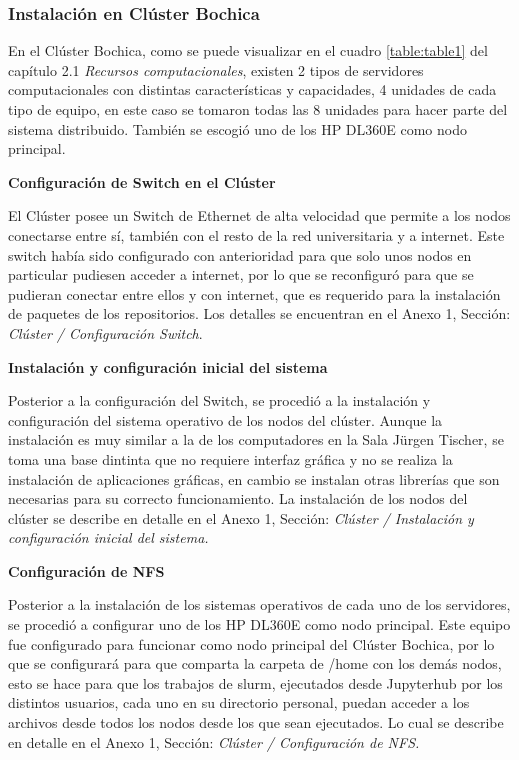 \begin{spacing}{1.5}
  \subsubsection{Instalación en Clúster Bochica}

  En el Clúster Bochica, como se puede visualizar en el cuadro \ref{table:table1} del capítulo 2.1 \textit{Recursos computacionales}, existen 2 tipos de servidores computacionales con distintas características y capacidades, 4 unidades de cada tipo de equipo, en este caso se tomaron todas las 8 unidades para hacer parte del sistema distribuido. También se escogió uno de los HP DL360E como nodo principal.

  \textbf{Configuración de Switch en el Clúster}

  El Clúster posee un Switch de Ethernet de alta velocidad que permite a los nodos conectarse entre sí, también con el resto de la red universitaria y a internet. Este switch había sido configurado con anterioridad para que solo unos nodos en particular pudiesen acceder a internet, por lo que se reconfiguró para que se pudieran conectar entre ellos y con internet, que es requerido para la instalación de paquetes de los repositorios. Los detalles se encuentran en el Anexo 1, Sección: \textit{Clúster / Configuración Switch}.

  \textbf{Instalación y configuración inicial del sistema}

  Posterior a la configuración del Switch, se procedió a la instalación y configuración del sistema operativo de los nodos del clúster. Aunque la instalación es muy similar a la de los computadores en la Sala Jürgen Tischer, se toma una base dintinta que no requiere interfaz gráfica y no se realiza la instalación de aplicaciones gráficas, en cambio se instalan otras librerías que son necesarias para su correcto funcionamiento. La instalación de los nodos del clúster se describe en detalle en el Anexo 1, Sección: \textit{Clúster / Instalación y configuración inicial del sistema.}

  \textbf{Configuración de NFS}

  Posterior a la instalación de los sistemas operativos de cada uno de los servidores, se procedió a configurar uno de los HP DL360E como nodo principal. Este equipo fue configurado para funcionar como nodo principal del Clúster Bochica, por lo que se configurará para que comparta la carpeta de /home con los demás nodos, esto se hace para que los trabajos de slurm, ejecutados desde Jupyterhub por los distintos usuarios, cada uno en su directorio personal, puedan acceder a los archivos desde todos los nodos desde los que sean ejecutados. Lo cual se describe en detalle en el Anexo 1, Sección: \textit{Clúster / Configuración de NFS.}


\end{spacing}
